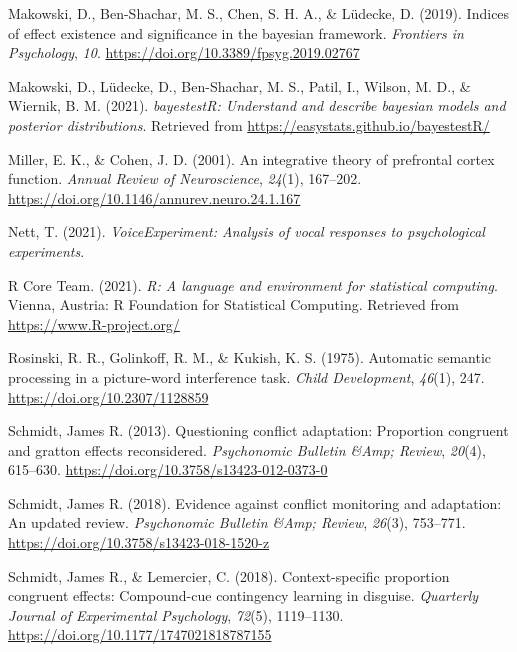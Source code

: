 \documentclass[
  ,man,floatsintext]{apa6}
\newlength{\cslhangindent}
\newlength{\cslentryspacingunit} %
\newenvironment{CSLReferences}[2] %
 {%
  \setlength{\parindent}{0pt}
  \ifodd #1
  \let\oldpar\par
  \def\par{\hangindent=\cslhangindent\oldpar}
  \fi
  \setlength{\parskip}{#2\cslentryspacingunit}
 }%
 {}
\begin{document}
\begin{CSLReferences}{1}{0}
\leavevmode{}%
Makowski, D., Ben-Shachar, M. S., Chen, S. H. A., \& Lüdecke, D. (2019). Indices of effect existence and significance in the bayesian framework. \emph{Frontiers in Psychology}, \emph{10}. \url{https://doi.org/10.3389/fpsyg.2019.02767}

\leavevmode{}%
Makowski, D., Lüdecke, D., Ben-Shachar, M. S., Patil, I., Wilson, M. D., \& Wiernik, B. M. (2021). \emph{bayestestR: Understand and describe bayesian models and posterior distributions}. Retrieved from \url{https://easystats.github.io/bayestestR/}

\leavevmode{}%
Miller, E. K., \& Cohen, J. D. (2001). An integrative theory of prefrontal cortex function. \emph{Annual Review of Neuroscience}, \emph{24}(1), 167--202. \url{https://doi.org/10.1146/annurev.neuro.24.1.167}

\leavevmode{}%
Nett, T. (2021). \emph{VoiceExperiment: Analysis of vocal responses to psychological experiments}.

\leavevmode{}%
R Core Team. (2021). \emph{R: A language and environment for statistical computing}. Vienna, Austria: R Foundation for Statistical Computing. Retrieved from \url{https://www.R-project.org/}

\leavevmode{}%
Rosinski, R. R., Golinkoff, R. M., \& Kukish, K. S. (1975). Automatic semantic processing in a picture-word interference task. \emph{Child Development}, \emph{46}(1), 247. \url{https://doi.org/10.2307/1128859}

\leavevmode{}%
Schmidt, James R. (2013). Questioning conflict adaptation: Proportion congruent and gratton effects reconsidered. \emph{Psychonomic Bulletin \&Amp; Review}, \emph{20}(4), 615--630. \url{https://doi.org/10.3758/s13423-012-0373-0}

\leavevmode{}%
Schmidt, James R. (2018). Evidence against conflict monitoring and adaptation: An updated review. \emph{Psychonomic Bulletin \&Amp; Review}, \emph{26}(3), 753--771. \url{https://doi.org/10.3758/s13423-018-1520-z}

\leavevmode{}%
Schmidt, James R., \& Lemercier, C. (2018). Context-specific proportion congruent effects: Compound-cue contingency learning in disguise. \emph{Quarterly Journal of Experimental Psychology}, \emph{72}(5), 1119--1130. \url{https://doi.org/10.1177/1747021818787155}


\end{CSLReferences}
\end{document}
